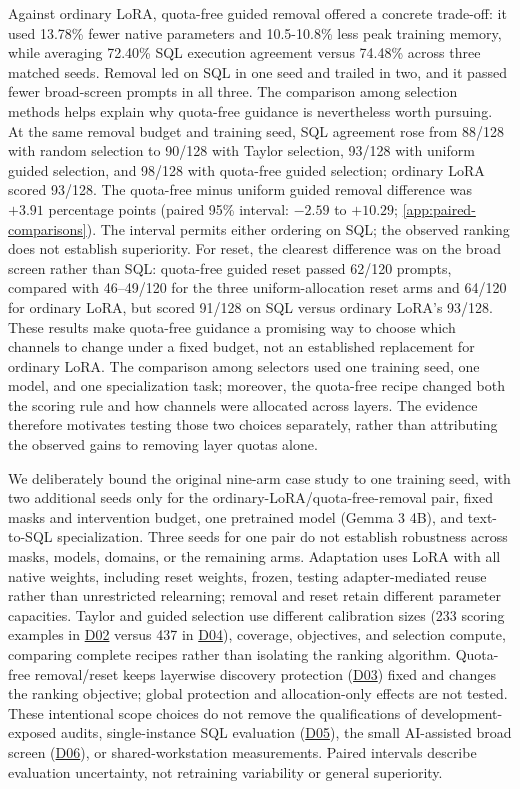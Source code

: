 \documentclass[10pt,letterpaper]{article}
\DeclareRobustCommand{\dataset}[1]{\hyperlink{dataset-#1}{\textnormal{#1}}}
\begin{document}
Against ordinary LoRA, quota-free guided removal offered a concrete trade-off: it 
used 13.78\% fewer native parameters and 10.5-10.8\% less peak training memory, 
while averaging 72.40\% SQL execution agreement versus 74.48\% across three 
matched seeds. Removal led on SQL in one seed and trailed in two, and it 
passed fewer broad-screen prompts in all three. The comparison among 
selection methods helps explain why quota-free guidance is nevertheless 
worth pursuing. At the same removal budget and training seed, SQL agreement 
rose from 88/128 with random selection to 90/128 with Taylor selection, 
93/128 with uniform guided selection, and 98/128 with quota-free guided selection; 
ordinary LoRA scored 93/128. The quota-free minus uniform guided removal
difference was $+3.91$ percentage points (paired 95\% interval:
$-2.59$ to $+10.29$; \autoref{app:paired-comparisons}). The interval permits
either ordering on SQL; the observed ranking does not establish superiority.
For reset, the clearest difference was on
the broad screen rather than SQL: quota-free guided reset passed 62/120 prompts, 
compared with 46--49/120 for the three uniform-allocation reset arms and 64/120 for ordinary
LoRA, but scored 91/128 on SQL versus ordinary LoRA's 93/128. These results make 
quota-free guidance a promising way to choose which channels to change under a 
fixed budget, not an established replacement for ordinary LoRA. The comparison 
among selectors used one training seed, one model, and one specialization task; 
moreover, the quota-free recipe changed both the scoring rule and how channels 
were allocated across layers. The evidence therefore motivates testing those two 
choices separately, rather than attributing the observed gains to removing layer 
quotas alone.

We deliberately bound the original nine-arm case study to one training seed,
with two additional seeds only for the ordinary-LoRA/quota-free-removal pair,
fixed masks and intervention budget, one pretrained model (Gemma 3 4B), and
text-to-SQL specialization. Three seeds for one pair do not establish
robustness across masks, models, domains, or the remaining arms. Adaptation uses LoRA with all native weights,
including reset weights, frozen, testing adapter-mediated reuse rather
than unrestricted relearning; removal and reset retain different parameter
capacities. Taylor and guided selection use different calibration sizes
(233 scoring examples in \dataset{D02} versus 437 in \dataset{D04}),
coverage, objectives, and selection compute, comparing complete recipes
rather than isolating the ranking algorithm. Quota-free removal/reset
keeps layerwise discovery protection (\dataset{D03}) fixed and changes
the ranking objective; global protection and allocation-only effects are
not tested. These intentional scope choices do not remove the qualifications
of development-exposed audits, single-instance SQL evaluation
(\dataset{D05}), the small AI-assisted broad screen (\dataset{D06}), or
shared-workstation measurements. Paired intervals describe evaluation
uncertainty, not retraining variability or general superiority.
\end{document}
